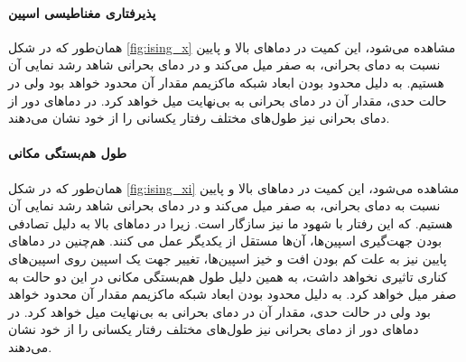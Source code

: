 \documentclass[11pt, a4paper]{article}
\begin{document}
\paragraph{پذیرفتاری مغناطیسی اسپین}
همان‌طور که در شکل
\ref{fig:ising_x}
مشاهده می‌شود،
این کمیت در دماهای بالا و پایین نسبت به دمای بحرانی، به صفر میل می‌کند
و در دمای بحرانی شاهد رشد نمایی آن هستیم.
به دلیل محدود بودن ابعاد شبکه ماکزیمم مقدار آن محدود خواهد بود ولی در حالت حدی،
مقدار آن در دمای بحرانی به بی‌نهایت میل خواهد کرد.
در دماهای دور از دمای بحرانی نیز طول‌های مختلف رفتار یکسانی را از خود نشان می‌دهند.

\paragraph{طول هم‌بستگی مکانی}
همان‌طور که در شکل
\ref{fig:ising_xi}
مشاهده می‌شود،
این کمیت در دماهای بالا و پایین نسبت به دمای بحرانی، به صفر میل می‌کند
و در دمای بحرانی شاهد رشد نمایی آن هستیم.
که این رفتار با شهود ما نیز سازگار است.
زیرا در دما‌های بالا به دلیل تصادفی بودن جهت‌گیری اسپین‌ها،
آن‌ها مستقل از یکدیگر عمل می کنند.
هم‌چنین در دما‌های پایین نیز به علت کم بودن افت و خیز اسپین‌ها،
تغییر جهت یک اسپین روی اسپین‌های کناری تاثیری نخواهد داشت،
به همین دلیل طول هم‌بستگی مکانی در این دو حالت به صفر میل خواهد کرد.
به دلیل محدود بودن ابعاد شبکه ماکزیمم مقدار آن محدود خواهد بود ولی در حالت حدی،
مقدار آن در دمای بحرانی به بی‌نهایت میل خواهد کرد.
در دماهای دور از دمای بحرانی نیز طول‌های مختلف رفتار یکسانی را از خود نشان می‌دهند.
\end{document}
